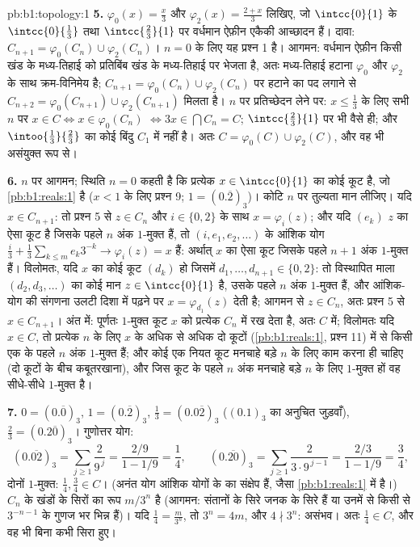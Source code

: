 \begin{solution}{pb:b1:topology:1}
\textbf{5.} $\varphi_0(x) = \frac x3$ और $\varphi_2(x) = \frac{2 + x}{3}$
लिखिए, जो $\intcc{0}{1}$ के $\intcc{0}{\frac13}$ तथा $\intcc{\frac23}{1}$ पर
वर्धमान ऐफ़ीन एकैकी आच्छादन हैं। दावा: $C_{n+1} = \varphi_0(C_n) \cup
\varphi_2(C_n)$। $n = 0$ के लिए यह प्रश्न 1 है। आगमन: वर्धमान ऐफ़ीन
 किसी खंड के मध्य-तिहाई को प्रतिबिंब खंड के मध्य-तिहाई पर भेजता
है, अतः मध्य-तिहाई हटाना $\varphi_0$ और $\varphi_2$ के साथ क्रम-विनिमेय है;
$C_{n+1} = \varphi_0(C_n) \cup \varphi_2(C_n)$ पर हटाने का पद लगाने से
$C_{n+2} = \varphi_0(C_{n+1}) \cup \varphi_2(C_{n+1})$ मिलता है। $n$ पर
प्रतिच्छेदन लेने पर: $x \leq \frac13$ के लिए सभी $n$ पर $x \in C \iff x \in
\varphi_0(C_n)$ $\iff 3x \in \bigcap C_n = C$; $\intcc{\frac23}{1}$ पर भी
वैसे ही; और $\intoo{\frac13}{\frac23}$ का कोई बिंदु $C_1$ में नहीं है। अतः
$C = \varphi_0(C) \cup \varphi_2(C)$, और वह भी असंयुक्त रूप से।

\textbf{6.} $n$ पर आगमन; स्थिति $n = 0$ कहती है कि प्रत्येक $x \in
\intcc{0}{1}$ का कोई कूट है, जो \cref{pb:b1:reals:1} है ($x < 1$ के लिए
प्रश्न 9; $1 = (0.\overline 2)_3$)। कोटि $n$ पर तुल्यता मान लीजिए। यदि $x
\in C_{n+1}$: तो प्रश्न 5 से $z \in C_n$ और $i \in \{0, 2\}$ के साथ $x =
\varphi_i(z)$; और यदि $(e_k)$ $z$ का ऐसा कूट है जिसके पहले $n$ अंक $1$-मुक्त
हैं, तो $(i, e_1, e_2, \dots)$ के आंशिक योग $\frac i3 + \frac13\sum_{k\leq
m} e_k 3^{-k} \to \varphi_i(z) = x$ हैं: अर्थात् $x$ का ऐसा कूट जिसके पहले
$n + 1$ अंक $1$-मुक्त हैं। विलोमतः, यदि $x$ का कोई कूट $(d_k)$ हो जिसमें
$d_1, \dots, d_{n+1} \in \{0, 2\}$: तो विस्थापित माला $(d_2, d_3, \dots)$ का
कोई मान $z \in \intcc{0}{1}$ है, उसके पहले $n$ अंक $1$-मुक्त हैं, और
आंशिक-योग की संगणना उलटी दिशा में पढ़ने पर $x = \varphi_{d_1}(z)$ देती है;
आगमन से $z \in C_n$, अतः प्रश्न 5 से $x \in C_{n+1}$। अंत में: पूर्णतः
$1$-मुक्त कूट $x$ को प्रत्येक $C_n$ में रख देता है, अतः $C$ में; विलोमतः यदि
$x \in C$, तो प्रत्येक $n$ के लिए $x$ के अधिक से अधिक दो कूटों
(\cref{pb:b1:reals:1}, प्रश्न 11) में से किसी एक के पहले $n$ अंक $1$-मुक्त
हैं; और कोई एक नियत कूट मनचाहे बड़े $n$ के लिए काम करना ही चाहिए (दो कूटों
के बीच कबूतरखाना), और जिस कूट के पहले $n$ अंक मनचाहे बड़े $n$ के लिए
$1$-मुक्त हों वह सीधे-सीधे $1$-मुक्त है।

\textbf{7.} $0 = (0.\overline 0)_3$, $1 = (0.\overline 2)_3$, $\frac13 =
(0.0\overline{2})_3$ ($(0.1)_3$ का अनुचित जुड़वाँ), $\frac23 =
(0.2\overline{0})_3$। गुणोत्तर योग:
\[
(0.\overline{02})_3 = \sum_{j\geq1} \frac{2}{9^{\,j}}
= \frac{2/9}{1 - 1/9} = \frac14 ,
\qquad
(0.\overline{20})_3 = \sum_{j\geq1} \frac{2}{3\cdot 9^{\,j-1}}
= \frac{2/3}{1 - 1/9} = \frac34 ,
\]
दोनों $1$-मुक्त: $\frac14, \frac34 \in C$। (अनंत योग आंशिक योगों के 
का संक्षेप हैं, जैसा \cref{pb:b1:reals:1} में है।) $C_n$ के खंडों के सिरों
का रूप $m/3^n$ है (आगमन: संतानों के सिरे जनक के सिरे हैं या उनमें से किसी से
$3^{-n-1}$ के गुणज भर भिन्न हैं)। यदि $\frac14 = \frac{m}{3^n}$, तो $3^n =
4m$, और $4 \nmid 3^n$: असंभव। अतः $\frac14 \in C$, और वह भी बिना कभी सिरा
हुए।


\end{solution}
